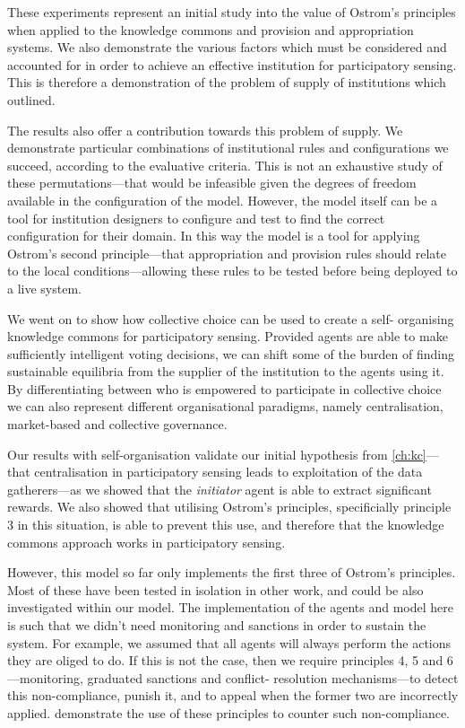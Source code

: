 These experiments represent an initial study into the value of Ostrom's
principles when applied to the knowledge commons and provision and
appropriation systems. We also demonstrate the various factors which must be
considered and accounted for in order to achieve an effective institution for
participatory sensing. This is therefore a demonstration of the problem of
supply of institutions which \citet{Ostrom1990} outlined.

The results also offer a contribution towards this problem of supply. We
demonstrate particular combinations of institutional rules and configurations
we succeed, according to the evaluative criteria. This is not an exhaustive
study of these permutations---that would be infeasible given the degrees of
freedom available in the configuration of the model. However, the model itself
can be a tool for institution designers to configure and test to find the
correct configuration for their domain. In this way the model is a tool for
applying Ostrom's second principle---that appropriation and provision rules
should relate to the local conditions---allowing these rules to be tested
before being deployed to a live system.

We went on to show how collective choice can be used to create a self-
organising knowledge commons for participatory sensing. Provided agents are
able to make sufficiently intelligent voting decisions, we can shift some of
the burden of finding sustainable equilibria from the supplier of the
institution to the agents using it. By differentiating between who is
empowered to participate in collective choice we can also represent different
organisational paradigms, namely centralisation, market-based and collective
governance.

Our results with self-organisation validate our initial hypothesis from
\autoref{ch:kc}---that centralisation in participatory sensing leads to
exploitation of the data gatherers---as we showed that the \emph{initiator}
agent is able to extract significant rewards. We also showed that utilising
Ostrom's principles, specificially principle 3 in this situation, is able to
prevent this use, and therefore that the knowledge commons approach works in
participatory sensing.

However, this model so far only implements the first three of Ostrom's
principles. Most of these have been tested in isolation in other work, and
could be also investigated within our model. The implementation of the agents
and model here is such that we didn't need monitoring and sanctions in order
to sustain the system. For example, we assumed that all agents will always
perform the actions they are oliged to do. If this is not the case, then we
require principles 4, 5 and 6---monitoring, graduated sanctions and conflict-
resolution mechanisms---to detect this non-compliance, punish it, and to
appeal when the former two are incorrectly applied. \citet{Pitt2012}
demonstrate the use of these principles to counter such non-compliance.

